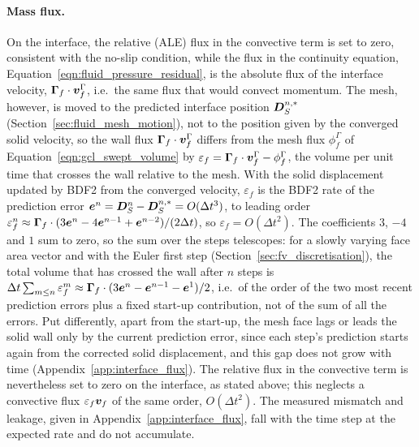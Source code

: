 \paragraph{Mass flux.}
On the interface, the relative (ALE) flux in the convective term is set to zero, consistent with the no-slip condition, while the flux in the continuity equation, Equation~\eqref{eqn:fluid_pressure_residual}, is the absolute flux of the interface velocity, $\boldsymbol{\Gamma}_f \cdot \boldsymbol{v}^{\Gamma}_f$, i.e.\ the same flux that would convect momentum.
The mesh, however, is moved to the predicted interface position $\boldsymbol{D}_S^{n,*}$ (Section~\ref{sec:fluid_mesh_motion}), not to the position given by the converged solid velocity, so the wall flux $\boldsymbol{\Gamma}_f\cdot\boldsymbol{v}^\Gamma_f$ differs from the mesh flux $\phi^\Gamma_f$ of Equation~\eqref{eqn:gcl_swept_volume} by $\varepsilon_f = \boldsymbol{\Gamma}_f\cdot\boldsymbol{v}^\Gamma_f - \phi^\Gamma_f$, the volume per unit time that crosses the wall relative to the mesh.
With the solid displacement updated by BDF2 from the converged velocity, $\varepsilon_f$ is the BDF2 rate of the prediction error $\boldsymbol{e}^{n} = \boldsymbol{D}_S^{n} - \boldsymbol{D}_S^{n,*} = O(\Delta t^3)$, to leading order $\varepsilon_f^n \approx \boldsymbol{\Gamma}_f\cdot(3\boldsymbol{e}^{n} - 4\boldsymbol{e}^{n-1} + \boldsymbol{e}^{n-2})/(2\Delta t)$, so $\varepsilon_f = O(\Delta t^2)$.
The coefficients $3$, $-4$ and $1$ sum to zero, so the sum over the steps telescopes: for a slowly varying face area vector and with the Euler first step (Section~\ref{sec:fv_discretisation}), the total volume that has crossed the wall after $n$ steps is $\Delta t\sum_{m\le n}\varepsilon_f^m \approx \boldsymbol{\Gamma}_f\cdot(3\boldsymbol{e}^{n} - \boldsymbol{e}^{n-1} - \boldsymbol{e}^{1})/2$, i.e.\ of the order of the two most recent prediction errors plus a fixed start-up contribution, not of the sum of all the errors.
Put differently, apart from the start-up, the mesh face lags or leads the solid wall only by the current prediction error, since each step's prediction starts again from the corrected solid displacement, and this gap does not grow with time (Appendix~\ref{app:interface_flux}).
The relative flux in the convective term is nevertheless set to zero on the interface, as stated above; this neglects a convective flux $\varepsilon_f \boldsymbol{v}_f$ of the same order, $O(\Delta t^2)$.
The measured mismatch and leakage, given in Appendix~\ref{app:interface_flux}, fall with the time step at the expected rate and do not accumulate.


